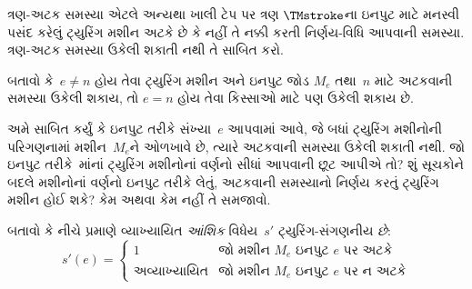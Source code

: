 \documentclass[../../../include/open-logic-section]{subfiles}
\begin{document}
\begin{prob}
ત્રણ-અટક સમસ્યા એટલે અન્યથા ખાલી ટેપ પર
ત્રણ $\TMstroke$ના ઇનપુટ માટે મનસ્વી પસંદ કરેલું
ટ્યુરિંગ મશીન અટકે છે કે નહીં તે નક્કી કરતી નિર્ણય-વિધિ
આપવાની સમસ્યા. ત્રણ-અટક સમસ્યા ઉકેલી શકાતી નથી
તે સાબિત કરો.
\end{prob}

\begin{prob}
બતાવો કે~$e \neq n$ હોય તેવા ટ્યુરિંગ મશીન અને ઇનપુટ
જોડ $M_e$ તથા~$n$ માટે અટકવાની સમસ્યા ઉકેલી શકાય,
તો $e = n$ હોય તેવા કિસ્સાઓ માટે પણ ઉકેલી શકાય છે.
\end{prob}

\begin{prob}
અમે સાબિત કર્યું કે ઇનપુટ તરીકે સંખ્યા~$e$ આપવામાં આવે,
જે બધાં ટ્યુરિંગ મશીનોની પરિગણનામાં મશીન~$M_e$ને
ઓળખાવે છે, ત્યારે અટકવાની સમસ્યા ઉકેલી શકાતી નથી.
જો ઇનપુટ તરીકે~માંનાં
ટ્યુરિંગ મશીનોનાં વર્ણનો સીધાં આપવાની છૂટ આપીએ તો?
શું સૂચકોને બદલે મશીનોનાં વર્ણનો ઇનપુટ તરીકે લેતું,
અટકવાની સમસ્યાનો નિર્ણય કરતું ટ્યુરિંગ મશીન હોઈ
શકે? કેમ અથવા કેમ નહીં તે સમજાવો.
\end{prob}

\begin{prob} બતાવો કે નીચે પ્રમાણે વ્યાખ્યાયિત
  \emph{આંશિક} વિધેય~$s'$ ટ્યુરિંગ-સંગણનીય \emph{છે}:
  \[
  s'(e) =
  \begin{cases}
    \text{1} & \text{જો મશીન~$M_e$ ઇનપુટ $e$ પર અટકે}\\
    \text{અવ્યાખ્યાયિત} & \text{જો મશીન~$M_e$ ઇનપુટ $e$ પર ન અટકે}
  \end{cases}
  \]
\end{prob}
\end{document}
